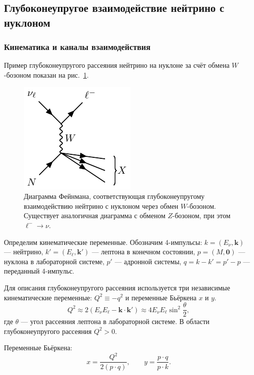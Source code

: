\subsection{Глубоконеупругое взаимодействие нейтрино с нуклоном}

\subsubsection{Кинематика и каналы взаимодействия}

Пример глубоконеупругого рассеяния нейтрино на нуклоне за счёт обмена $W$-бозоном показан на рис.~\ref{fig:DIS}. 

\begin{figure}[!h]
\centering
\includegraphics[width=0.4\linewidth]{images/neutrino-nucleon-dis.pdf}
\caption{Диаграмма Фейнмана, соответствующая глубоконеупругому взаимодействию нейтрино с нуклоном через обмен $W$-бозоном. Существует аналогичная диаграмма с обменом $Z$-бозоном, при этом $\ell^- \to \nu$.}
\label{fig:DIS}
\end{figure}

Определим кинематические переменные. Обозначим 4-импульсы: 
$k = (E_\nu, \bm{k})$ — нейтрино, 
$k' = (E_\ell, \bm{k}')$ — лептона в конечном состоянии, 
$p = (M, \bm{0})$ — нуклона в лабораторной системе, 
$p'$ — адронной системы, 
$q = k - k' = p' - p$ — переданный 4-импульс.

Для описания глубоконеупругого рассеяния используется три независимые кинематические переменные: \( Q^2 \equiv -q^2\) и переменные Бьёркена \( x \) и \( y \).
\begin{equation}
  Q^2 \approx 2(E_\nu E_\ell - \bm{k} \cdot \bm{k}') \approx 4E_\nu E_\ell \sin^2\!\frac{\theta}{2},
\end{equation}
где \( \theta \) — угол рассеяния лептона в лабораторной системе. В области глубоконеупругого рассеяния \( Q^2 > 0 \).

Переменные Бьёркена:
\begin{equation}
  x = \frac{Q^2}{2(p \cdot q)}, 
  \qquad 
  y = \frac{p \cdot q}{p \cdot k}.
\end{equation}

